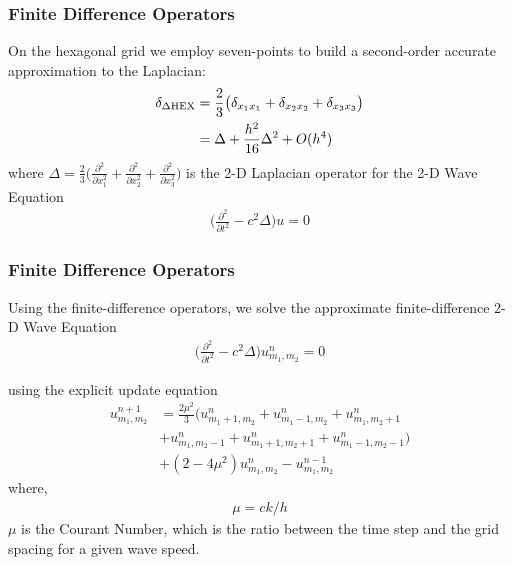 \documentclass{beamer}
\begin{document}
\begin{frame}
\frametitle{Finite Difference Operators}
On the hexagonal grid we employ seven-points to build a second-order accurate approximation to the Laplacian:
\begin{align}
\delta_{\Delta \text{HEX}} &= \frac{2}{3} \big( \delta_{x_1 x_1} + \delta_{x_2 x_2} + \delta_{x_3 x_3}\big) \notag \\
&= \Delta + \frac{h^2}{16} \Delta^2 + O(h^4)
\end{align}
where $\Delta = \frac{2}{3}\big( \frac{\partial^2}{\partial x_1^2} + \frac{\partial^2}{\partial x_2^2} + \frac{\partial^2}{\partial x_3^2}\big)$ is the 2-D Laplacian operator for the 2-D Wave Equation
\begin{align}
\bigg(\frac{\partial^2}{\partial t^2} - c^2 \Delta \bigg) u = 0
\end{align}
\end{frame}
\begin{frame}
\frametitle{Finite Difference Operators}
Using the finite-difference operators, we solve the approximate finite-difference 2-D Wave Equation
\begin{align}
\bigg(\frac{\partial^2}{\partial t^2} - c^2 \Delta \bigg) u^{n}_{m_1,m_2} = 0
\end{align}

using the explicit update equation
\begin{align}
u^{n+1}_{m_1,m_2} &= \frac{2\mu^2 }{3} \big( u^{n}_{m_1+1,m_2} + u^{n}_{m_1-1,m_2} + u^{n}_{m_1,m_2+1} \\
&+ u^{n}_{m_1,m_2-1} + u^{n}_{m_1+1,m_2+1} + u^{n}_{m_1-1,m_2-1} \big) \\
&+ (2-4\mu^2) u^{n}_{m_1,m_2} - u^{n-1}_{m_1,m_2}
\end{align}
where, 
\begin{align}
\mu = ck/h \label{eq:CourantNumber}
\end{align}
$\mu$ is the Courant Number, which is the ratio between the time step and the grid spacing for a given wave speed. 
\end{frame}
\end{document}
